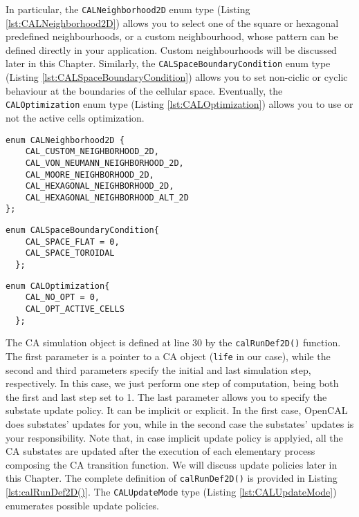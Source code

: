 In particular, the \verb'CALNeighborhood2D' enum type (Listing
\ref{lst:CALNeighborhood2D}) allows you to select one of the square or
hexagonal predefined neighbourhoods, or a custom neighbourhood, whose
pattern can be defined directly in your application. Custom
neighbourhoods will be discussed later in this Chapter. Similarly, the
\verb'CALSpaceBoundaryCondition' enum type (Listing
\ref{lst:CALSpaceBoundaryCondition}) allows you to set non-ciclic or
cyclic behaviour at the boundaries of the cellular space. Eventually,
the \verb'CALOptimization' enum type (Listing
\ref{lst:CALOptimization}) allows you to use or not the active cells
optimization.

\begin{lstlisting}[float,floatplacement=H, label=lst:CALNeighborhood2D, caption=The CALNeighborhood2D enum type., numbers=none]
  enum CALNeighborhood2D { 
    CAL_CUSTOM_NEIGHBORHOOD_2D,
    CAL_VON_NEUMANN_NEIGHBORHOOD_2D,
    CAL_MOORE_NEIGHBORHOOD_2D,
    CAL_HEXAGONAL_NEIGHBORHOOD_2D,
    CAL_HEXAGONAL_NEIGHBORHOOD_ALT_2D 
};
\end{lstlisting}  

\begin{lstlisting}[float,floatplacement=H, label=lst:CALSpaceBoundaryCondition, caption=The CALSpaceBoundaryCondition enum type., numbers=none]
  enum CALSpaceBoundaryCondition{
    CAL_SPACE_FLAT = 0,         
    CAL_SPACE_TOROIDAL
  };
\end{lstlisting}

\begin{lstlisting}[float,floatplacement=H, label=lst:CALOptimization, caption=The CALOptimization enum type., numbers=none]
  enum CALOptimization{
    CAL_NO_OPT = 0,
    CAL_OPT_ACTIVE_CELLS        
  };
\end{lstlisting}

The CA simulation object is defined at line 30 by the
\verb'calRunDef2D()' function. The first parameter is a pointer to a
CA object (\verb'life' in our case), while the second and third parameters
specify the initial and last simulation step, respectively. In this
case, we just perform one step of computation, being both the first
and last step set to 1. The last parameter allows you to specify the
substate update policy. It can be implicit or explicit. In the first
case, OpenCAL does substates' updates for you, while in the second case
the substates' updates is your responsibility. Note that, in case
implicit update policy is applyied, all the CA substates are updated
after the execution of each elementary process composing the CA
transition function. We will discuss update policies later in
this Chapter. The complete definition of \verb'calRunDef2D()' is
provided in Listing \ref{lst:calRunDef2D()}. The \verb'CALUpdateMode'
type (Listing \ref{lst:CALUpdateMode}) enumerates possible update
policies.

